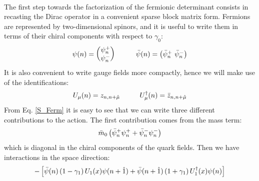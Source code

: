 \\ The first step towards the factorization of the fermionic determinant consists in recasting the Dirac operator in a convenient sparse block matrix form. Fermions are represented by two-dimensional spinors, and it is useful to write them in terms of their chiral components with respect to $\gamma_0$:
\begin{equation}
    \psi(n) = \begin{pmatrix}
        \psi^+_n \\
        \psi^-_n
    \end{pmatrix} \hspace{10mm} \Bar{\psi}(n) = \begin{pmatrix}
        \Bar{\psi}^+_n \,\, \Bar{\psi}^-_n
    \end{pmatrix}
\end{equation}
It is also convenient to write gauge fields more compactly, hence we will make use of the identifications:
\begin{equation}
    U_\mu(n) = z_{n, n+\hat{\mu}} \hspace{10mm} U_\mu^\dagger (n) = \Bar{z}_{n, n + \hat{\mu}}
\end{equation}
From Eq. \eqref{S_Ferm} it is easy to see that we can write three different contributions to the action. 
The first contribution comes from the mass term:
\begin{equation}
    \Bar{m}_0 \left( \Bar{\psi}^+_n \psi^+_n + \Bar{\psi}^-_n \psi^-_n \right)
\end{equation}
which is diagonal in the chiral components of the quark fields. Then we have interactions in the space direction:
\begin{equation}
    - \left[ \Bar{\psi}(n) \left(1 - \gamma_1 \right) U_1(x) \psi(n + \hat{1}) + \Bar{\psi}(n + \hat{1}) \left(1 + \gamma_1 \right) U^\dagger_1(x) \psi(n) \right]
\end{equation}

